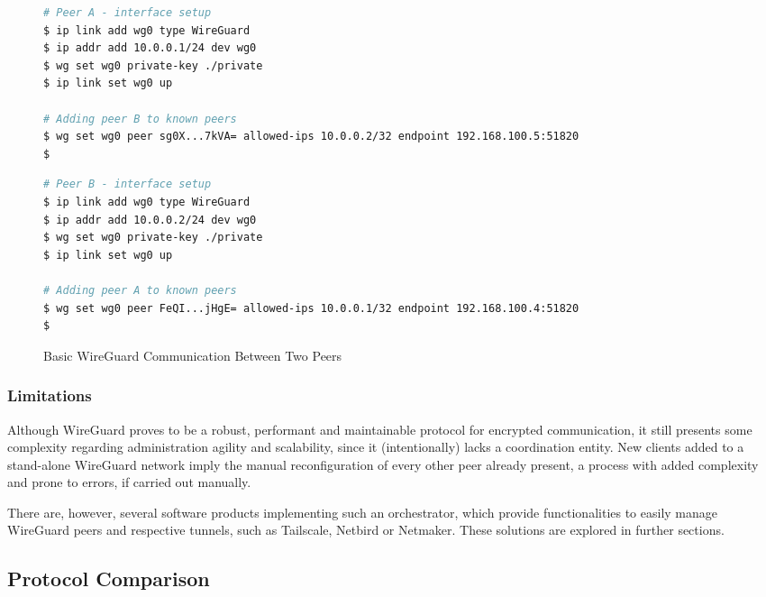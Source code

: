 \documentclass[11pt,twoside,a4paper]{report}
\begin{document}
\begin{figure}
\begin{multicols}{2}
\begin{lstlisting}[language=sh, frame=single, breaklines=true, breakatwhitespace=true, basicstyle=\small]
# Peer A - interface setup
$ ip link add wg0 type WireGuard
$ ip addr add 10.0.0.1/24 dev wg0
$ wg set wg0 private-key ./private
$ ip link set wg0 up

# Adding peer B to known peers
$ wg set wg0 peer sg0X...7kVA= allowed-ips 10.0.0.2/32 endpoint 192.168.100.5:51820
$

\end{lstlisting}
\columnbreak
\begin{lstlisting}[language=sh, frame=single, breaklines=true, breakatwhitespace=true, basicstyle=\small]
# Peer B - interface setup
$ ip link add wg0 type WireGuard
$ ip addr add 10.0.0.2/24 dev wg0
$ wg set wg0 private-key ./private
$ ip link set wg0 up

# Adding peer A to known peers
$ wg set wg0 peer FeQI...jHgE= allowed-ips 10.0.0.1/32 endpoint 192.168.100.4:51820
$

\end{lstlisting}
\end{multicols}
\caption{Basic WireGuard Communication Between Two Peers}
\label{fig:wgconf}
\end{figure}

\subsubsection{Limitations}
\label{sec:wglimits}

Although WireGuard proves to be a robust, performant and maintainable protocol for encrypted communication, it still presents some complexity regarding administration agility and scalability, since it (intentionally) lacks a coordination entity. New clients added to a stand-alone WireGuard network imply the manual reconfiguration of every other peer already present, a process with added complexity and prone to errors, if carried out manually.

There are, however, several software products implementing such an orchestrator, which provide functionalities to easily manage WireGuard peers and respective tunnels, such as Tailscale, Netbird or Netmaker. These solutions are explored in further sections.


\subsection{Protocol Comparison}
\end{document}
